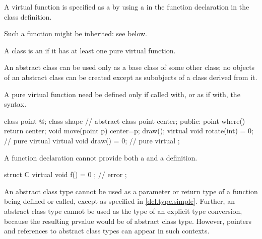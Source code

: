 \pnum
A virtual function is specified as
a  by using a
 in the function declaration
in the class definition.
\begin{note}
Such a function might be inherited: see below.
\end{note}
A class is an 
if it has at least one pure virtual function.
\begin{note}
An abstract class can be used only as a base class of some other class;
no objects of an abstract class can be created
except as subobjects of a class
derived from it.
\end{note}
%
A pure virtual function need be defined only if called with, or as if
with, the 
syntax.
\begin{example}
\begin{codeblock}
class point { @\commentellip@ };
class shape {                   // abstract class
  point center;
public:
  point where() { return center; }
  void move(point p) { center=p; draw(); }
  virtual void rotate(int) = 0; // pure virtual
  virtual void draw() = 0;      // pure virtual
};
\end{codeblock}
\end{example}
\begin{note}
A function declaration cannot provide both a 
and a definition.
\end{note}
\begin{example}
\begin{codeblock}
struct C {
  virtual void f() = 0 { };     // error
};
\end{codeblock}
\end{example}

\pnum
\begin{note}
An abstract class type cannot be used
as a parameter or return type of
a function being defined or called,
except as specified in \ref{dcl.type.simple}.
Further, an abstract class type cannot be used as
the type of an explicit type conversion,
because the resulting prvalue would be of abstract class type.
However, pointers and references to abstract class types
can appear in such contexts.
\end{note}

